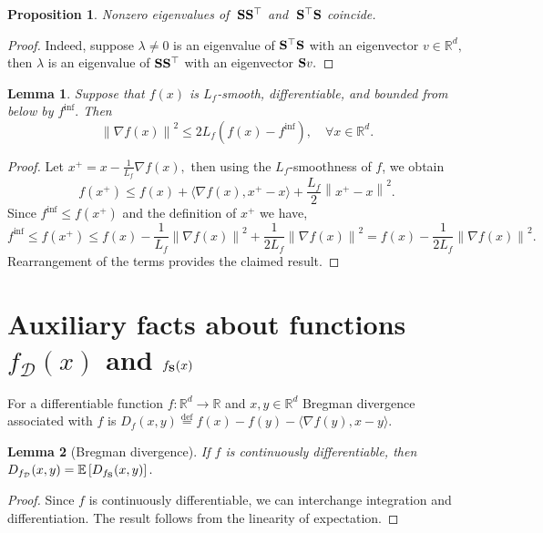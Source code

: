 \documentclass{article}
\newcommand{\bb}{\mathbb}
\newcommand{\norm}[1]{\left\| #1 \right\|}
\newcommand{\eqdef}{\stackrel{\text{def}}{=}}
\newcommand{\Exp}[1]{{\bb E}\left[#1\right]}
\newtheorem{lemma}{Lemma}
\newtheorem{proposition}{Proposition}
\theoremstyle{plain}
\newcommand{\tf}{f_{\mathcal{D}}}
\newcommand{\mS}{{\bf S}}
\theoremstyle{plain}
\theoremstyle{definition}
\theoremstyle{remark}
\begin{document}
\begin{proposition}\label{proposition:eigenvalues}
   Nonzero eigenvalues of $\;\mS\mS^{\top}$ and $\;\mS^{\top}\mS$ coincide.
\end{proposition}
\begin{proof}
    Indeed, suppose $\lambda\neq 0$ is an eigenvalue of $\mS^{\top}\mS$ with an eigenvector $v\in\mathbb{R}^d,$ then $\lambda$ is an eigenvalue of $\mS\mS^{\top}$ with an eigenvector $\mS v.$
\end{proof}


\begin{lemma}\label{lemma:smoothness_bregman}
    Suppose that $f(x)$ is $L_f$-smooth, differentiable, and bounded from below by $f^{\inf}.$ Then
    \begin{equation}\label{eq:smoothness_bregman}
        \norm{\nabla f(x)}^2\leq 2L_f\left(f(x)-f^{\inf}\right),\quad\forall x\in\mathbb{R}^d.
    \end{equation}
\end{lemma}
\begin{proof}
    Let $x^{+} = x - \frac{1}{L_f}\nabla f(x),$ then using the $L_f$-smoothness of $f$, we obtain
	\begin{equation*}
		f(x^{+})\leq f(x) + \langle\nabla f(x), x^{+} - x\rangle + \frac{L_f}{2}\left\|x^{+}-x\right\|^2.
	\end{equation*}
	Since $f^{\inf}\leq f(x^{+})$ and the definition of $x^{+}$ we have,
	\begin{equation*}
		f^{\inf}\leq f(x^{+})\leq f(x) - \frac{1}{L_f}\left\|\nabla f(x)\right\|^2 + \frac{1}{2L_f}\left\|\nabla f(x)\right\|^2=f(x) - \frac{1}{2L_f}\left\|\nabla f(x)\right\|^2.
	\end{equation*}
	Rearrangement of the terms provides the claimed result.
\end{proof}
\clearpage
\section{Auxiliary facts about functions $\tf(x)$ and $f_{\mS}(x)$}

For a differentiable function $f:\mathbb{R}^d\to\mathbb{R}$ and $x,y\in\mathbb{R}^d$ Bregman divergence associated with $f$ is $D_f(x,y)\eqdef f(x)-f(y)-\langle\nabla f(y),x-y\rangle.$
\begin{lemma}[Bregman divergence]
If $f$ is continuously differentiable, then $D_{\tf}(x,y) = \Exp{D_{f_{\mS}}(x,y)}.$
\end{lemma}
\begin{proof}
    Since $f$ is continuously differentiable, we can interchange integration and differentiation. The result follows from the linearity of expectation.
\end{proof}
\end{document}
